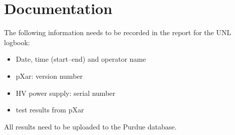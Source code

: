 \documentclass[10pt]{unlsilabsop}
\begin{document}
\section{Documentation}
The following information needs to be recorded in the report for the UNL logbook:
\begin{itemize}
\item Date, time (start--end) and operator name
\item pXar: version number
\item HV power supply: serial number
\item test results from pXar
\end{itemize}

All results need to be uploaded to the Purdue database.
\end{document}
